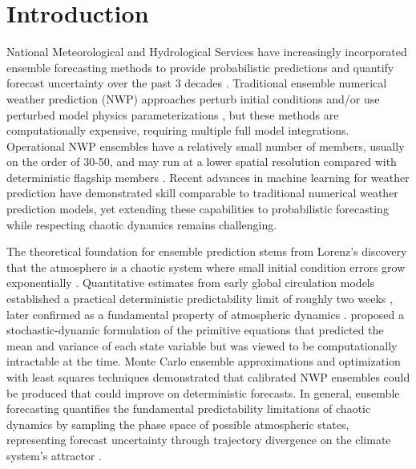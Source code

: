 \documentclass{agujournal2019}
\begin{document}
\section{Introduction}
National Meteorological and Hydrological Services have increasingly incorporated ensemble forecasting methods to provide probabilistic predictions and quantify forecast uncertainty over the past 3 decades \cite{leutbecher2008svs, palmer2019stochastic}. Traditional ensemble numerical weather prediction (NWP) approaches perturb initial conditions and/or use perturbed model physics parameterizations \cite{molteni1996ens,buizza2005comparison,leutbecher2017stochastic, berner2017stochastic}, but these methods are computationally expensive, requiring multiple full model integrations. Operational NWP ensembles have a relatively small number of members, usually on the order of 30-50, and may run at a lower spatial resolution compared with deterministic flagship members \cite{Fu2024-zo}. Recent advances in machine learning for weather prediction \cite{keisler2022fourcastnet, pathak2022fourcastnet, bi2023pangu, Lam2023graphcast, chen2023fuxi, schreck2025} have demonstrated skill comparable to traditional numerical weather prediction models, yet extending these capabilities to probabilistic forecasting while respecting chaotic dynamics remains challenging. 

The theoretical foundation for ensemble prediction stems from Lorenz's discovery that the atmosphere is a chaotic system where small initial condition errors grow exponentially \cite{lorenz1963deterministic}. Quantitative estimates from early global circulation models established a practical deterministic predictability limit of roughly two weeks \cite{charney1966applicability}, later confirmed as a fundamental property of atmospheric dynamics \cite{lorenz1969predictability, Lorenz1969-tc, lorenz1996predictability}.  proposed a stochastic-dynamic formulation of the primitive equations that predicted the mean and variance of each state variable but was viewed to be computationally intractable at the time. Monte Carlo ensemble approximations \cite{Leith1974} and optimization with least squares techniques \cite{Pitcher1977-li} demonstrated that calibrated NWP ensembles could be produced that could improve on deterministic forecasts. In general, ensemble forecasting quantifies the fundamental predictability limitations of chaotic dynamics by sampling the phase space of possible atmospheric states, representing forecast uncertainty through trajectory divergence on the climate system's attractor \cite{palmer2019stochastic, toth1993ensemble}.
\end{document}
